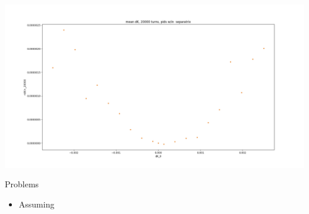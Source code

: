 \documentclass[pdf]{beamer}
\begin{document}
\begin{frame}
	\centering
	\includegraphics[scale=.3]{mean_dK_test_mean_dK_vs_dK0_20000trns_parabola}
\end{frame}
	
	\begin{frame}{Problems}
	\begin{itemize}
		\item Assuming
	\end{itemize}
	\end{frame}
\end{document}
